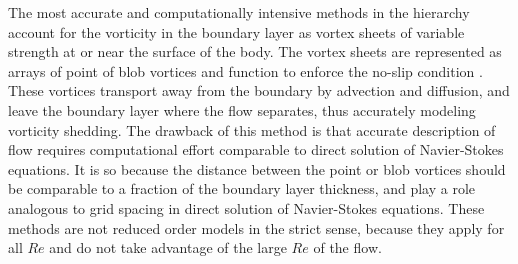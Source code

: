The most accurate and computationally intensive methods in the hierarchy account for the vorticity in the boundary layer as vortex sheets of variable strength at or near the surface of the body.
The vortex sheets are represented as arrays of point of blob vortices and function to enforce the no-slip condition \cite{shukla2007inviscid,chorin1978vortex,leonard1980vortex,sethian1988validation,anderson1989vorticity,koumoutsakos1994boundary,summers1996numerical,eldredge2002vortex}.
These vortices transport away from the boundary by advection and diffusion, and leave the boundary layer where the flow separates, thus accurately modeling vorticity shedding.
The drawback of this method is that accurate description of flow requires computational effort comparable to direct solution of Navier-Stokes equations.
It is so because the distance between the point or blob vortices should be comparable to a fraction of the boundary layer thickness, and play a role analogous to grid spacing in direct solution of Navier-Stokes equations.
These methods are not reduced order models in the strict sense, because they apply for all $Re$ and do not take advantage of the large $Re$ of the flow.
